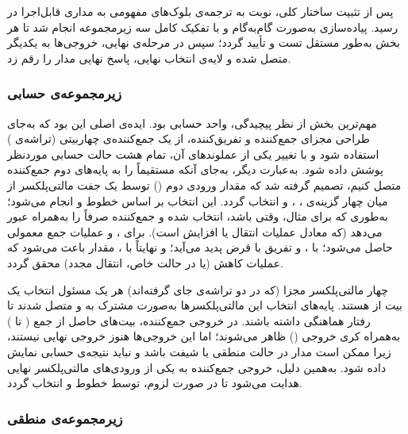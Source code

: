 \documentclass[a4paper,12pt]{article}
\numberwithin{figure}{subsection}
\begin{document}
پس از تثبیت ساختار کلی، نوبت به ترجمه‌ی بلوک‌های مفهومی به مداری قابل‌اجرا در  رسید. پیاده‌سازی به‌صورت گام‌به‌گام و با تفکیک کامل سه زیرمجموعه انجام شد تا هر بخش به‌طور مستقل تست و تأیید گردد؛ سپس در مرحله‌ی نهایی، خروجی‌ها به یکدیگر متصل شده و لایه‌ی انتخاب نهایی، پاسخ نهایی مدار را رقم زد.

\subsubsection*{زیرمجموعه‌ی حسابی}
\leavevmode\par
\vspace{0.2cm}

مهم‌ترین بخش از نظر پیچیدگی، واحد حسابی بود. ایده‌ی اصلی این بود که به‌جای طراحی مجزای جمع‌کننده و تفریق‌کننده، از یک جمع‌کننده‌ی چهاربیتی (تراشه‌ی ) استفاده شود و با تغییر یکی از عملوندهای آن، تمام هشت حالت حسابی موردنظر پوشش داده شود. به‌عبارت دیگر، به‌جای آنکه مستقیماً  را به پایه‌های دوم جمع‌کننده متصل کنیم، تصمیم گرفته شد که مقدار ورودی دوم () توسط یک جفت مالتی‌پلکسر  از میان چهار گزینه‌ی ، ،  و  انتخاب گردد. این انتخاب بر اساس خطوط  و  انجام می‌شود؛ به‌طوری که برای مثال، وقتی  باشد،  انتخاب شده و جمع‌کننده صرفاً  را به‌همراه  عبور می‌دهد (که معادل عملیات انتقال یا افزایش  است). برای ،  و عملیات جمع معمولی حاصل می‌شود؛ با ،  و تفریق با قرض پدید می‌آید؛ و نهایتاً با ، مقدار  باعث می‌شود که عملیات کاهش  (یا در حالت خاص، انتقال مجدد) محقق گردد.

چهار مالتی‌پلکسر مجزا (که در دو تراشه‌ی  جای گرفته‌اند) هر یک مسئول انتخاب یک بیت از  هستند. پایه‌های انتخاب این مالتی‌پلکسرها به‌صورت مشترک به  و  متصل شدند تا رفتار هماهنگی داشته باشند. در خروجی جمع‌کننده، بیت‌های حاصل از جمع ( تا ) به‌همراه کری خروجی () ظاهر می‌شوند؛ اما این خروجی‌ها هنوز خروجی نهایی نیستند، زیرا ممکن است مدار در حالت منطقی یا شیفت باشد و نباید نتیجه‌ی حسابی نمایش داده شود. به‌همین دلیل، خروجی جمع‌کننده به یکی از ورودی‌های مالتی‌پلکسر نهایی هدایت می‌شود تا در صورت لزوم، توسط خطوط  و  انتخاب گردد.

\subsubsection*{زیرمجموعه‌ی منطقی}
\leavevmode\par
\vspace{0.2cm}
\end{document}
